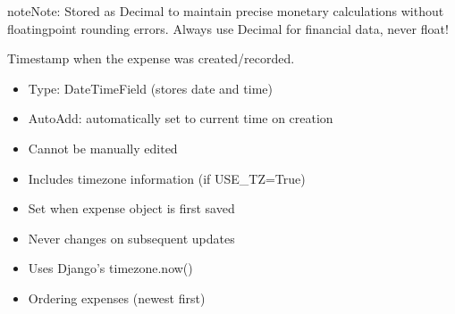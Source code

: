 \documentclass[letterpaper,10pt,english]{sphinxmanual}
\begin{document}
\begin{fulllineitems}
\begin{fulllineitems}
\begin{description}
\begin{itemize}
\end{itemize}

\end{description}

\begin{sphinxadmonition}{note}{Note:}
\sphinxAtStartPar
Stored as Decimal to maintain precise monetary calculations
without floating\sphinxhyphen{}point rounding errors. Always use Decimal
for financial data, never float!
\end{sphinxadmonition}

\end{fulllineitems}


\begin{fulllineitems}
\label{\detokenize{expensesApp:id17}}
\pysigstartsignatures
\pysigline
{}
\pysigstopsignatures
\sphinxAtStartPar
Timestamp when the expense was created/recorded.
\begin{description}
\begin{itemize}
\item {} 
\sphinxAtStartPar
Type: DateTimeField (stores date and time)

\item {} 
\sphinxAtStartPar
Auto\sphinxhyphen{}Add: automatically set to current time on creation

\item {} 
\sphinxAtStartPar
Cannot be manually edited

\item {} 
\sphinxAtStartPar
Includes timezone information (if USE\_TZ=True)

\end{itemize}

\begin{itemize}
\item {} 
\sphinxAtStartPar
Set when expense object is first saved

\item {} 
\sphinxAtStartPar
Never changes on subsequent updates

\item {} 
\sphinxAtStartPar
Uses Django’s timezone.now()

\end{itemize}

\begin{itemize}
\item {} 
\sphinxAtStartPar
Ordering expenses (newest first)


\end{itemize}
\end{description}
\end{fulllineitems}
\end{fulllineitems}
\end{document}
